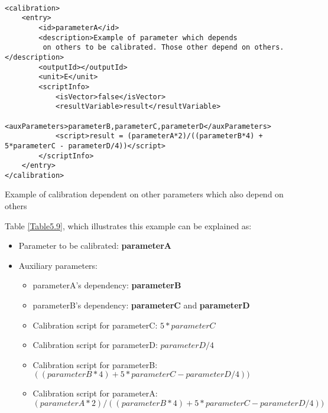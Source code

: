 

 \begin{table}[H]
\lstset{language=XML}
\begin{lstlisting}

<calibration>
	<entry>
		<id>parameterA</id>
		<description>Example of parameter which depends
		 on others to be calibrated. Those other depend on others.</description>
		<outputId></outputId>
		<unit>E</unit>
		<scriptInfo>
			<isVector>false</isVector>
			<resultVariable>result</resultVariable>
			<auxParameters>parameterB,parameterC,parameterD</auxParameters>
			<script>result = (parameterA*2)/((parameterB*4) + 5*parameterC - parameterD/4))</script>
		</scriptInfo>
	</entry>
</calibration>
\end{lstlisting}
\caption{Example of calibration dependent on other parameters which also depend on others} 
\label{Table5.9}
\end{table}

Table \ref{Table5.9}, which illustrates this example can be explained as:
\begin{itemize}
\item Parameter to be calibrated: \textbf{parameterA}
\item Auxiliary parameters:
	\begin{itemize}
		\item parameterA's dependency: \textbf{parameterB}
		\item parameterB's dependency: \textbf{parameterC} and \textbf{parameterD}
		\item Calibration script for parameterC: $5*parameterC$
		\item Calibration script for parameterD: $parameterD/4$
		\item Calibration script for parameterB: $((parameterB*4) + 5*parameterC - parameterD/4))$
		\item Calibration script for parameterA: $(parameterA*2)/((parameterB*4) + 5*parameterC - parameterD/4))$
	\end{itemize}
\end{itemize}



